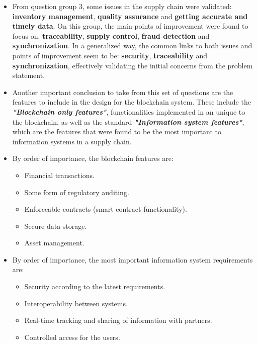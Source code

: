 \begin{itemize}
    \item From question group 3, some issues in the supply chain were validated: \textbf{inventory management}, \textbf{quality assurance} and \textbf{getting accurate and timely data}. On this group, the main points of improvement were found to focus on: \textbf{traceability}, \textbf{supply control}, \textbf{fraud detection} and \textbf{synchronization}. In a generalized way, the common links to both issues and points of improvement seem to be: \textbf{security}, \textbf{traceability} and \textbf{synchronization}, effectively validating the initial concerns from the problem statement.
    \item Another important conclusion to take from this set of questions are the features to include in the design for the blockchain system. These include the \textit{\textbf{"Blockchain only features"}}, functionalities implemented in an unique to the blockchain, as well as the standard \textit{\textbf{"Information system features"}}, which are the features that were found to be the most important to information systems in a supply chain.
    \item By order of importance, the blockchain features are:
    \begin{itemize}
        \item Financial transactions.
        \item Some form of regulatory auditing.
        \item Enforceable contracts (smart contract functionality).
        \item Secure data storage.
        \item Asset management.
    \end{itemize}
    \item By order of importance, the most important information system requirements are:
    \begin{itemize}
        \item Security according to the latest requirements.
        \item Interoperability between systems.
        \item Real-time tracking and sharing of information with partners.
        \item Controlled access for the users.
    \end{itemize}
\end{itemize}











